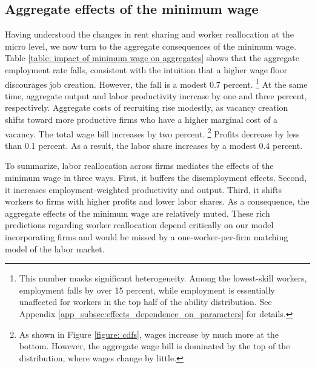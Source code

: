\subsection{Aggregate effects of the minimum wage}

Having understood the changes in rent sharing and worker reallocation at the micro level, we now turn to the aggregate consequences of the minimum wage. Table \ref{table: impact of minimum wage on aggregates} shows that the aggregate employment rate falls, consistent with the intuition that a higher wage floor discourages job creation. However, the fall is a modest 0.7 percent.%
%
\footnote{This number masks significant heterogeneity. Among the lowest-skill workers, employment falls by over 15 percent, while employment is essentially unaffected for workers in the top half of the ability distribution. See Appendix \ref{app_subsec:effects_dependence_on_parameters} for details.} %
%
At the same time, aggregate output and labor productivity increase by one and three percent, respectively. Aggregate costs of recruiting rise modestly, as vacancy creation shifts toward more productive firms who have a higher marginal cost of a vacancy. The total wage bill increases by two percent.%
%
\footnote{As shown in Figure \ref{figure: cdfs}, wages increase by much more at the bottom. However, the aggregate wage bill is dominated by the top of the distribution, where wages change by little.} %
%
Profits decrease by less than 0.1 percent. As a result, the labor share increases by a modest 0.4 percent.

To summarize, labor reallocation across firms mediates the effects of the minimum wage in three ways. First, it buffers the disemployment effects. Second, it increases employment-weighted productivity and output. Third, it shifts workers to firms with higher profits and lower labor shares. As a consequence, the aggregate effects of the minimum wage are relatively muted. These rich predictions regarding worker reallocation depend critically on our model incorporating firms and would be missed by a one-worker-per-firm matching model of the labor market.


